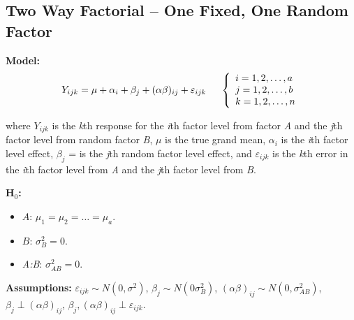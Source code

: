 \documentclass[12pt,english]{article}\usepackage[]{graphicx}\usepackage[table]{xcolor}
\begin{document}
\subsection{Two Way Factorial -- One Fixed, One Random Factor}

\textbf{Model:} \[Y_{ijk} = \mu + \alpha_i + \beta_j + (\alpha\beta)_{ij} + \varepsilon_{ijk} \hspace{0.2in} \left\{
                \begin{array}{ll}
                  i = 1,2,\dots,a\\
                  j = 1,2,\dots,b\\
                  k = 1,2,\dots,n
                \end{array}
              \right.\]

 
\noindent where $Y_{ijk}$ is the \textit{k}th response for the \textit{i}th factor level from factor \textit{A} and the \textit{j}th factor level from random factor \textit{B}, $\mu$ is the true grand mean, $\alpha_i$ is the \textit{i}th factor level effect, $\beta_j$ = is the \textit{j}th random factor level effect, and $\varepsilon_{ijk}$ is the \textit{k}th error in the \textit{i}th factor level from \textit{A} and the \textit{j}th factor level from \textit{B}. \\
\vspace{0.05in}

\noindent \textbf{H$_0$:}
\begin{itemize}
\item $A$: $\mu_1 = \mu_2 = \dots = \mu_a$.
\item $B$: $\sigma^2_B = 0$.
\item \textit{A:B}: $\sigma^2_{AB}  = 0$.
\end{itemize}
\vspace{0.1in}

\noindent \textbf{Assumptions:} $\varepsilon_{ijk} \sim N(0, \sigma^2)$, \hspace{0.1in} $\beta_j \sim N(0 \sigma^2_B)$, \hspace{0.1in}  $(\alpha\beta)_{ij} \sim N(0, \sigma^2_{AB})$, \hspace{0.1in} $\beta_j \perp (\alpha\beta)_{ij}$, \hspace{0.1in}   $\beta_j,(\alpha\beta)_{ij} \perp \varepsilon_{ijk}$.
\vspace{0.1in}
\end{document}
